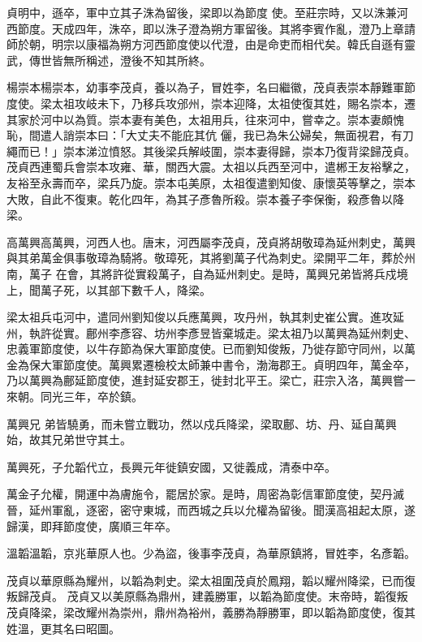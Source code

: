 \begin{pinyinscope}
 貞明中，遜卒，軍中立其子洙為留後，梁即以為節度
 使。至莊宗時，又以洙兼河西節度。天成四年，洙卒，即以洙子澄為朔方軍留後。其將李賓作亂，澄乃上章請師於朝，明宗以康福為朔方河西節度使以代澄，由是命吏而相代矣。韓氏自遜有靈武，傳世皆無所稱述，澄後不知其所終。



 楊崇本楊崇本，幼事李茂貞，養以為子，冒姓李，名曰繼徽，茂貞表崇本靜難軍節度使。梁太祖攻岐未下，乃移兵攻邠州，崇本迎降，太祖使復其姓，賜名崇本，遷其家於河中以為質。崇本妻有美色，太祖用兵，往來河中，嘗幸之。崇本妻頗愧恥，間遣人誚崇本曰：「大丈夫不能庇其伉
 儷，我已為朱公婦矣，無面視君，有刀繩而已！」崇本涕泣憤怒。其後梁兵解岐圍，崇本妻得歸，崇本乃復背梁歸茂貞。茂貞西連蜀兵會崇本攻雍、華，關西大震。太祖以兵西至河中，遣郴王友裕擊之，友裕至永壽而卒，梁兵乃旋。崇本屯美原，太祖復遣劉知俊、康懷英等擊之，崇本大敗，自此不復東。乾化四年，為其子彥魯所殺。崇本養子李保衡，殺彥魯以降梁。



 高萬興高萬興，河西人也。唐末，河西屬李茂貞，茂貞將胡敬璋為延州刺史，萬興與其弟萬金俱事敬璋為騎將。敬璋死，其將劉萬子代為刺史。梁開平二年，葬於州南，萬子
 在會，其將許從實殺萬子，自為延州刺史。是時，萬興兄弟皆將兵戍境上，聞萬子死，以其部下數千人，降梁。



 梁太祖兵屯河中，遣同州劉知俊以兵應萬興，攻丹州，執其刺史崔公實。進攻延州，執許從實。鄜州李彥容、坊州李彥昱皆棄城走。梁太祖乃以萬興為延州刺史、忠義軍節度使，以牛存節為保大軍節度使。已而劉知俊叛，乃徙存節守同州，以萬金為保大軍節度使。萬興累遷檢校太師兼中書令，渤海郡王。貞明四年，萬金卒，乃以萬興為鄜延節度使，進封延安郡王，徙封北平王。梁亡，莊宗入洛，萬興嘗一來朝。同光三年，卒於鎮。



 萬興兄
 弟皆驍勇，而未嘗立戰功，然以戍兵降梁，梁取鄜、坊、丹、延自萬興始，故其兄弟世守其土。



 萬興死，子允韜代立，長興元年徙鎮安國，又徙義成，清泰中卒。



 萬金子允權，開運中為膚施令，罷居於家。是時，周密為彰信軍節度使，契丹滅晉，延州軍亂，逐密，密守東城，而西城之兵以允權為留後。聞漢高祖起太原，遂歸漢，即拜節度使，廣順三年卒。



 溫韜溫韜，京兆華原人也。少為盜，後事李茂貞，為華原鎮將，冒姓李，名彥韜。



 茂貞以華原縣為耀州，以韜為刺史。梁太祖圍茂貞於鳳翔，韜以耀州降梁，已而復叛歸茂貞。
 茂貞又以美原縣為鼎州，建義勝軍，以韜為節度使。末帝時，韜復叛茂貞降梁，梁改耀州為崇州，鼎州為裕州，義勝為靜勝軍，即以韜為節度使，復其姓溫，更其名曰昭圖。




\end{pinyinscope}
